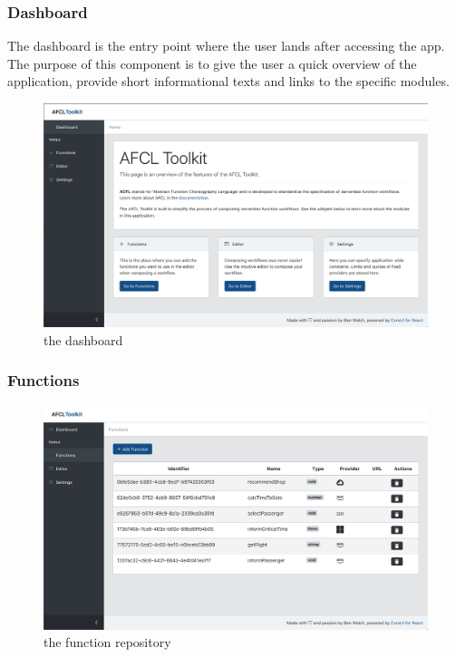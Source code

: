 \documentclass[a4paper,11pt,pdftex,halfparskip,cleardoubleempty]{scrbook}
\begin{document}
\subsubsection{Dashboard}

The dashboard is the entry point where the user lands after accessing the app. The purpose of this component is to give the user a quick overview of the application, provide short informational texts and links to the specific modules. 

\begin{figure}[ht]
  \centering
  \includegraphics[width=\textwidth]{dashboard}
  \caption{the dashboard}
\end{figure}

\subsubsection{Functions}

\begin{figure}[ht]
  \centering
  \includegraphics[width=\textwidth]{functions}
  \caption{the function repository}
\end{figure}
\end{document}
